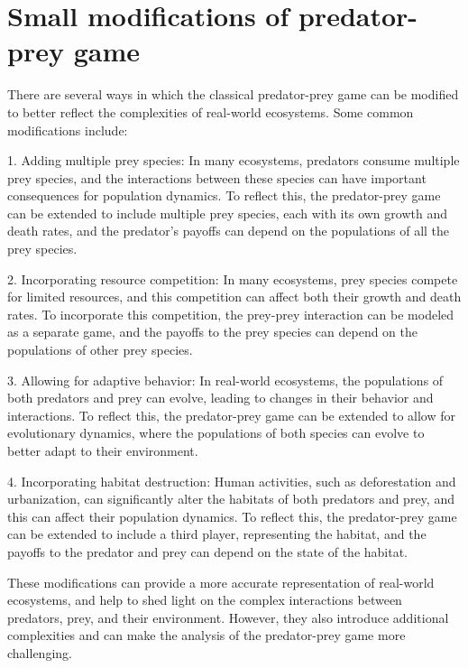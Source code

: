 \section{Small modifications of predator-prey game} \label{sec:features}
There are several ways in which the classical predator-prey game can be modified to better reflect the complexities of real-world ecosystems. Some common modifications include:

1. Adding multiple prey species: In many ecosystems, predators consume multiple prey species, and the interactions between these species can have important consequences for population dynamics. To reflect this, the predator-prey game can be extended to include multiple prey species, each with its own growth and death rates, and the predator's payoffs can depend on the populations of all the prey species.

2. Incorporating resource competition: In many ecosystems, prey species compete for limited resources, and this competition can affect both their growth and death rates. To incorporate this competition, the prey-prey interaction can be modeled as a separate game, and the payoffs to the prey species can depend on the populations of other prey species.

3. Allowing for adaptive behavior: In real-world ecosystems, the populations of both predators and prey can evolve, leading to changes in their behavior and interactions. To reflect this, the predator-prey game can be extended to allow for evolutionary dynamics, where the populations of both species can evolve to better adapt to their environment.

4. Incorporating habitat destruction: Human activities, such as deforestation and urbanization, can significantly alter the habitats of both predators and prey, and this can affect their population dynamics. To reflect this, the predator-prey game can be extended to include a third player, representing the habitat, and the payoffs to the predator and prey can depend on the state of the habitat.

These modifications can provide a more accurate representation of real-world ecosystems, and help to shed light on the complex interactions between predators, prey, and their environment. However, they also introduce additional complexities and can make the analysis of the predator-prey game more challenging.

